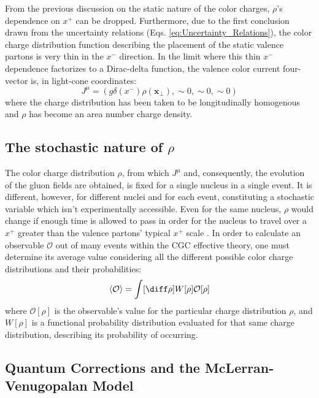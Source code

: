 From the previous discussion on the static nature of the color charges, $\rho$'s dependence on $x^+$ can be dropped. Furthermore, due to the first conclusion drawn from the uncertainty relations (Eqs. \ref{eq:Uncertainty_Relations}), the color charge distribution function describing the placement of the static valence partons is very thin in the $x^-$ direction. In the limit where this thin $x^-$ dependence factorizes to a Dirac-delta function, the valence color current four-vector is, in light-cone coordinates:
\begin{equation}
	{J}^\mu = (g \delta (x^-) \rho (\mathbf{x}_\perp), \sim 0, \sim 0, \sim 0)
	\label{eq:+_Current}
\end{equation}
where the charge distribution has been taken to be longitudinally homogenous and $\rho$ has become an area number charge density.

\subsection{The stochastic nature of $\rho$}
The color charge distribution $\rho$, from which $J^\mu$ and, consequently, the evolution of the gluon fields are obtained, is fixed for a single nucleus in a single event. It is different, however, for different nuclei and for each event, constituting a stochastic variable \cite{Gelis_2010} which isn't experimentally accessible.  Even for the same nucleus, $\rho$ would change if enough time is allowed to pass in order for the nucleus to travel over a $x^+$ greater than the valence partons' typical $x^+$ scale \cite{Gelis_Habilitation}. In order to calculate an observable $\mathcal{O}$ out of many events within the \gls{CGC} effective theory, one must determine its average value considering all the different possible color charge distributions and their probabilities: \cite{Gelis_2010}
\begin{equation}
	\left< \mathcal{O} \right> = \int [\diff \rho] W[\rho] \mathcal{O}[\rho]
\end{equation}
where $\mathcal{O}[\rho]$ is the observable's value for the particular charge distribution $\rho$, and $W[\rho]$ is a functional probability distribution evaluated for that same charge distribution, describing its probability of occurring.

\subsection{Quantum Corrections and the McLerran-Venugopalan Model}

